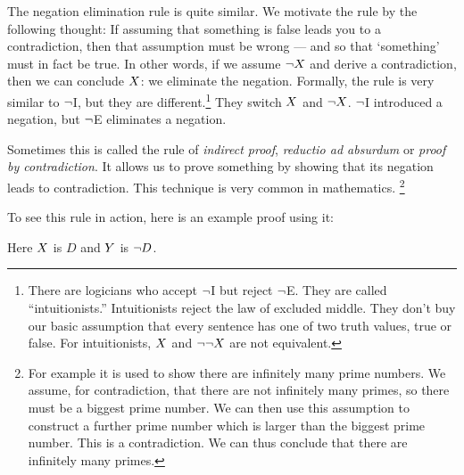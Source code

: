 The negation elimination rule is quite similar.
%
We motivate the rule by the following thought:
If assuming that something is false leads you to a contradiction, then that assumption must be wrong --- and so that `something' must in fact be true. In other words, if we assume $\neg X$ and derive a contradiction, then we can conclude $X$: we eliminate the negation.
Formally, the rule is very similar to $\neg$I, but they are different.\footnote{There are logicians who accept $\neg$I but reject $\neg$E. They are called ``intuitionists.'' Intuitionists reject the law of excluded middle. They don't buy our basic assumption that every sentence has one of two truth values, true or false. For intuitionists, $X$ and $\neg\neg X$ are not equivalent. 
} They switch $X$ and $\neg X$. 
 $\neg$I introduced a negation, but $\neg$E eliminates a negation.
 
Sometimes this is called the rule of \emph{indirect proof}, \emph{reductio ad absurdum} or \emph{proof by contradiction}. It allows us to prove something by showing that its negation leads to contradiction. This technique is very common in mathematics.%
\footnote{
For example it is used to show there are infinitely many prime numbers. We assume, for contradiction, that there are not infinitely many primes, so there must be a biggest prime number. We can then use this assumption to construct a further prime number which is larger than the biggest prime number. This is a contradiction. We can thus conclude that there are infinitely many primes.
}



To see this rule in action, here is an example proof using it:
	\begin{pf}
		\open
		\close
	\end{pf}
	Here $X$ is $D$ and $Y$ is $\neg D$. 


